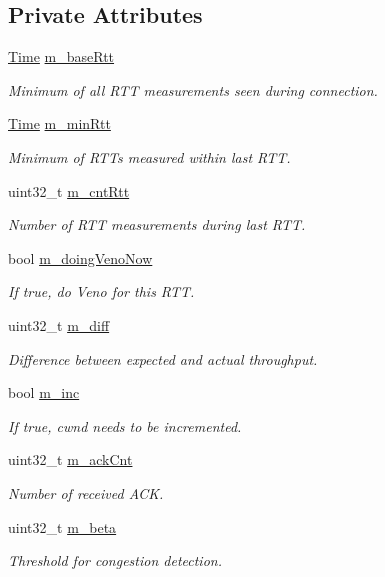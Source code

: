 \subsection*{Private Attributes}
\begin{DoxyCompactItemize}
\item 
\hyperlink{classns3_1_1Time}{Time} \hyperlink{classns3_1_1TcpVeno_aeae3dd21752b2d7dd774202fe8a6d5e1}{m\+\_\+base\+Rtt}
\begin{DoxyCompactList}\small\item\em Minimum of all R\+TT measurements seen during connection. \end{DoxyCompactList}\item 
\hyperlink{classns3_1_1Time}{Time} \hyperlink{classns3_1_1TcpVeno_a9fd4b7308b7f0b7cd4179d6f65aba383}{m\+\_\+min\+Rtt}
\begin{DoxyCompactList}\small\item\em Minimum of R\+T\+Ts measured within last R\+TT. \end{DoxyCompactList}\item 
uint32\+\_\+t \hyperlink{classns3_1_1TcpVeno_a56ba63c2e02200d19b808741c1f68c64}{m\+\_\+cnt\+Rtt}
\begin{DoxyCompactList}\small\item\em Number of R\+TT measurements during last R\+TT. \end{DoxyCompactList}\item 
bool \hyperlink{classns3_1_1TcpVeno_aaf29a4f390edec44d3b5db1a70a5d119}{m\+\_\+doing\+Veno\+Now}
\begin{DoxyCompactList}\small\item\em If true, do Veno for this R\+TT. \end{DoxyCompactList}\item 
uint32\+\_\+t \hyperlink{classns3_1_1TcpVeno_ae98841fe53c815c3d754675d2857ac80}{m\+\_\+diff}
\begin{DoxyCompactList}\small\item\em Difference between expected and actual throughput. \end{DoxyCompactList}\item 
bool \hyperlink{classns3_1_1TcpVeno_a0962710ab039eac65735fb61bbe850b2}{m\+\_\+inc}
\begin{DoxyCompactList}\small\item\em If true, cwnd needs to be incremented. \end{DoxyCompactList}\item 
uint32\+\_\+t \hyperlink{classns3_1_1TcpVeno_abcf5701edb3712b02e492701f1abfdac}{m\+\_\+ack\+Cnt}
\begin{DoxyCompactList}\small\item\em Number of received A\+CK. \end{DoxyCompactList}\item 
uint32\+\_\+t \hyperlink{classns3_1_1TcpVeno_ad041620f3dc6988923c412d8a4183f36}{m\+\_\+beta}
\begin{DoxyCompactList}\small\item\em Threshold for congestion detection. \end{DoxyCompactList}\end{DoxyCompactItemize}
